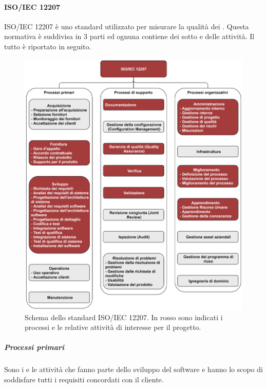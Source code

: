 \paragraph{ISO/IEC 12207}
ISO/IEC 12207 è uno standard utilizzato per misurare la qualità dei . Questa normativa è suddivisa in 3 parti
ed ognuna contiene dei sotto  e delle attività. Il tutto è riportato in seguito. 

\begin{figure}[h]
    \centering
    \includegraphics[scale=0.53]{Immagini/IsoIec12207.png}
    \caption{Schema dello standard ISO/IEC 12207. In rosso sono indicati i processi e le relative attività di interesse per il progetto.}
\end{figure}

\subparagraph{Processi primari}
Sono i  e le attività che fanno parte dello sviluppo del software e hanno lo scopo di soddisfare tutti i requisiti concordati con il cliente.

